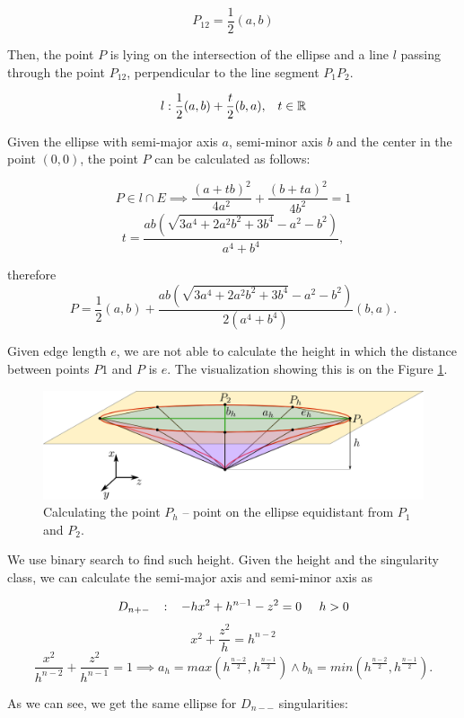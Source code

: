 $$P_{12} = \frac{1}{2}(a, b)$$

Then, the point $P$ is lying on the
intersection of the ellipse and a line $l$ passing through the point $P_{12}$, perpendicular to the
line segment $P_1P_2$.

$$l: \frac{1}{2}(a,b) + \frac{t}{2}(b,a), \hspace{3mm} t \in \mathbb{R}$$

Given the ellipse with semi-major axis $a$, 
semi-minor axis $b$ and the center in the point $(0, 0)$, the point $P$ can be 
calculated as follows:

$$P \in l \cap E \implies 
\frac{(a+tb)^2}{4a^2} + \frac{(b+ta)^2}{4b^2} = 1$$
$$t=\frac{ab(\sqrt{3a^4+2a^2b^2+3b^4}-a^2-b^2)}{a^4+b^4},$$

therefore 
$$P=\frac{1}{2}(a,b) + \frac{ab(\sqrt{3a^4+2a^2b^2+3b^4}-a^2-b^2)}{2(a^4+b^4)}(b,a).$$

Given edge length $e$, we are not able to calculate the height in which the distance
between points $P1$ and $P$ is $e$. The visualization showing this is on the Figure \ref{img:17}.

\begin{figure}
    \centerline{\includegraphics[scale=0.5]{images/img17}}
    \caption[Calculating the point $P_h$]
    {Calculating the point $P_h$ -- point on the ellipse equidistant from $P_1$ and $P_2$.}
    \label{img:17}
\end{figure}

We use binary search to find such height.
Given the height and the singularity class, we can calculate the semi-major axis
and semi-minor axis as 

$$D_{n+-} \hspace{3mm} :\hspace{3mm}  -hx^2+h^{n-1}-z^2 = 0 \hspace{5mm} h>0$$
$$x^2 + \frac{z^2}{h} = h^{n-2}$$
$$\frac{x^2}{h^{n-2}} + \frac{z^2}{h^{n-1}} = 1 \implies a_h=max(h^\frac{n-2}{2}, h^\frac{n-1}{2}) \land b_h=min(h^\frac{n-2}{2}, h^\frac{n-1}{2}).$$

As we can see, we get the same ellipse for $D_{n--}$ singularities:

